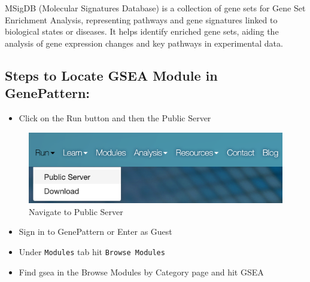 \documentclass[
]{book}
\providecommand{\tightlist}{%
  \setlength{\itemsep}{0pt}\setlength{\parskip}{0pt}}
\begin{document}
MSigDB (Molecular Signatures Database) is a collection of gene sets for Gene Set Enrichment Analysis, representing pathways and gene signatures linked to biological states or diseases. It helps identify enriched gene sets, aiding the analysis of gene expression changes and key pathways in experimental data.

\hypertarget{steps-to-locate-gsea-module-in-genepattern}{%
\subsection{Steps to Locate GSEA Module in GenePattern:}\label{steps-to-locate-gsea-module-in-genepattern}}

\begin{itemize}
\tightlist
\item
  Click on the Run button and then the Public Server
\end{itemize}

\begin{figure}

{\centering \includegraphics{images/GenePattern-Run} 

}

\caption{Navigate to Public Server}\label{fig:unnamed-chunk-23}
\end{figure}

\begin{itemize}
\item
  Sign in to GenePattern or Enter as Guest
\item
  Under \texttt{Modules} tab hit \texttt{Browse\ Modules}
\item
  Find gsea in the Browse Modules by Category page and hit GSEA
\end{itemize}
\end{document}

